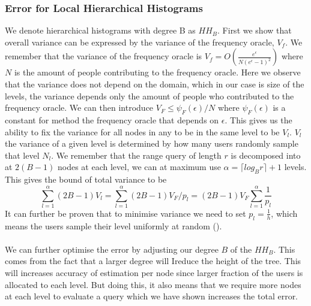 \documentclass[11pt]{article}
\theoremstyle{definition}
\begin{document}
\subsubsection{Error for Local Hierarchical Histograms}
We denote hierarchical histograms with degree B as $HH_B$. First we show that overall variance can be expressed by the variance of the frequency oracle, $V_f$.  We remember that the variance of the frequency oracle is $V_f= O\left(\frac{e^{\epsilon}}{N\left(e^{\epsilon}-1\right)^{2}}\right)$ where $N$ is the amount of people contributing to the frequency oracle. Here we observe that the variance does not depend on the domain, which in our case is size of the levels, the variance depends only the amount of people who contributed to the frequency oracle. We can then introduce $V_F\leq\psi_F(\epsilon)/N$ where $\psi_F(\epsilon)$ is a constant for method the frequency oracle that depends on $\epsilon$. This gives us the ability to fix the variance for all nodes in any to be in the same level to be $V_l$. $V_l$ the variance of a given level is determined by how many users randomly sample that level $N_l$. We remember that the range query of length $r$ is decomposed into at $2(B-1)$ nodes at each level, we can at maximum use $\alpha=\lceil log_B r\rceil+1$ levels. This gives the bound of total variance to be \[\sum_{l=1}^{\alpha}(2 B-1) V_{l}=\sum_{l=1}^{\alpha}(2 B-1) V_{F} / p_{l}=(2 B-1) V_{F} \sum_{l=1}^{\alpha} \frac{1}{p_{l}}\]
It can further be proven that to minimise variance we need to set $p_{l}=\frac{1}{h}$, which means the users sample their level uniformly at random (\cite[5]{local}). \\ \\

\noindent We can further optimise the error by adjusting our degree $B$ of the $HH_B$. This comes from the fact that a larger degree will Ireduce the height of the tree. This will increases accuracy of estimation per node since larger fraction of the users is allocated to each level. But doing this, it also means that we require more nodes at each level to evaluate a query which we have shown increases the total error. 
\end{document}
